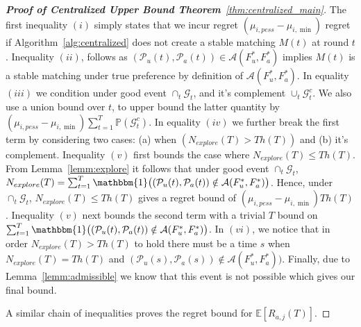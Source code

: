 \documentclass{article}
\begin{document}
\begin{proof}[\textbf{Proof of Centralized Upper Bound Theorem}~\ref{thm:centralized_main}]
The first inequality $(i)$ simply states that we incur regret $(\mu_{i, pess} - \mu_{i, \min})$ regret if Algorithm~\ref{alg:centralized} does not create a stable matching $M(t)$ at round $t$. Inequality $(ii)$, follows as  $(\mathcal{P}_{u}(t), \mathcal{P}_{a}(t)) \in \mathcal{A}(F^*_u, F^*_a)$ implies $M(t)$ is a stable matching under true preference by definition of $\mathcal{A}(F^*_u, F^*_a)$. In equality $(iii)$ we condition under good event $\cap_t\mathcal{G}_t$, and it's complement $\cup_t\mathcal{G}^c_t$. We also use a union bound over $t$, to upper bound the latter quantity by $(\mu_{i, pess} - \mu_{i, \min}) \sum_{t=1}^{T} \mathbb{P}(\mathcal{G}^c_t)$. In equality $(iv)$ we further break the first term by considering two cases: (a) when $(N_{explore}(T) > Th(T))$ and  (b) it's complement. Inequality $(v)$  first bounds the case where $N_{explore}(T) \leq Th(T)$. From Lemma~\ref{lemm:explore} it follows that under good event $\cap_t\mathcal{G}_t$, $N_{explore}(T) = \sum_{t=1}^{T}  \mathbbm{1}\big((\mathcal{P}_{u}(t), \mathcal{P}_{a}(t)) \notin \mathcal{A}(F^*_u, F^*_a)\big)$. Hence,  under $\cap_t\mathcal{G}_t$, $N_{explore}(T) \leq Th(T)$ gives a regret bound of $(\mu_{i, pess} - \mu_{i, \min})Th(T)$. Inequality $(v)$ next bounds the second term with a trivial $T$ bound on $\sum_{t=1}^{T}  \mathbbm{1}\big((\mathcal{P}_{u}(t), \mathcal{P}_{a}(t)) \notin \mathcal{A}(F^*_u, F^*_a)\big)$. In $(vi)$, we notice that in order $N_{explore}(T) > Th(T)$ to hold there must be a time $s$ when $N_{explore}(T) = Th(T)$ and  $(\mathcal{P}_{u}(s), \mathcal{P}_{a}(s)) \notin \mathcal{A}(F^*_u, F^*_a)\big)$. Finally, due to Lemma~\ref{lemm:admissible} we know that this event is not possible which gives our final bound.

A similar chain of inequalities proves the regret bound for  $\mathbb{E}[R_{a,j}(T)]$.
\end{proof}
\end{document}
